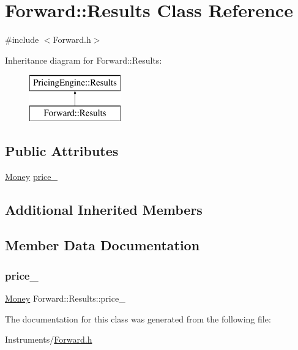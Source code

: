 \hypertarget{class_forward_1_1_results}{}\section{Forward\+:\+:Results Class Reference}
\label{class_forward_1_1_results}


{\ttfamily \#include $<$Forward.\+h$>$}

Inheritance diagram for Forward\+:\+:Results\+:\begin{figure}[H]
\begin{center}
\leavevmode
\includegraphics[height=2.000000cm]{class_forward_1_1_results}
\end{center}
\end{figure}
\subsection*{Public Attributes}
\begin{DoxyCompactItemize}
\item 
\hyperlink{_name_def_8h_a5a9d48c16a694e9a2d9f1eca730dc8c5}{Money} \hyperlink{class_forward_1_1_results_a61aa9829fa13483ef961836334e1d473}{price\+\_\+}
\end{DoxyCompactItemize}
\subsection*{Additional Inherited Members}


\subsection{Member Data Documentation}
\hypertarget{class_forward_1_1_results_a61aa9829fa13483ef961836334e1d473}{}\label{class_forward_1_1_results_a61aa9829fa13483ef961836334e1d473} 
\subsubsection{\texorpdfstring{price\+\_\+}{price\_}}
{\footnotesize\ttfamily \hyperlink{_name_def_8h_a5a9d48c16a694e9a2d9f1eca730dc8c5}{Money} Forward\+::\+Results\+::price\+\_\+}



The documentation for this class was generated from the following file\+:\begin{DoxyCompactItemize}
\item 
Instruments/\hyperlink{_forward_8h}{Forward.\+h}\end{DoxyCompactItemize}
